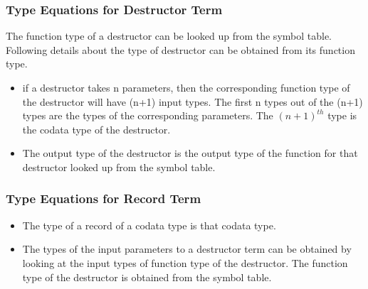 \documentclass[11pt]{article}
\begin{document}
\subsubsection {Type Equations for Destructor Term}

The function type of a destructor can be looked up from the symbol table. Following details about the type of destructor can be obtained from its function type.
\begin{itemize}
  \item if a destructor takes n parameters, then the corresponding function type of the destructor will have (n+1) input types. The first n types out of the (n+1) types are the types of the corresponding parameters. The $(n+1)^{th}$ type is the codata type of the destructor.

  \item The output type of the destructor is the output type of the function for that destructor looked up from the symbol table.    
\end{itemize}

\subsubsection {Type Equations for Record Term}
\begin{itemize}
  \item The type of a {\sf record} of a codata type is that codata type.
  \item The types of the input parameters to a destructor term can be obtained by looking at the input types of function type of the destructor. The function type of the destructor is obtained from the symbol table.
\end{itemize}

~~\\~~\\ 
\end{document}
